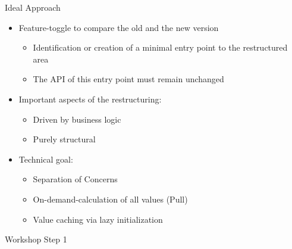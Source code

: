 \begin{frame}[fragile]{Ideal Approach}
\begin{itemize}
\item Feature-toggle to compare the old and the new version
\begin{itemize}
\item Identification or creation of a minimal entry point to the restructured area
\item The API of this entry point must remain unchanged
\end{itemize}
\end{itemize}

\begin{itemize}
\item Important aspects of the restructuring:
\begin{itemize}
\item Driven by business logic
\item Purely structural
\end{itemize}
\end{itemize}

\begin{itemize}
\item Technical goal:
\begin{itemize}
\item Separation of Concerns
\item On-demand-calculation of all values (\glqq Pull\grqq{})
\item Value caching via lazy initialization
\end{itemize}

\end{itemize}
\end{frame}


\begin{frame}[fragile]{Workshop Step 1}
\end{frame}


